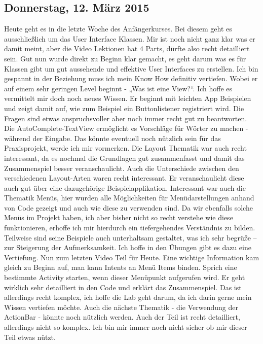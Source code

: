 \documentclass[12pt,a4paper,bibliography=totocnumbered,listof=totocnumbered]{scrartcl}
\begin{document}
\subsection{Donnerstag, 12. März 2015}
Heute geht es in die letzte Woche des Anfängerkurses. Bei diesem geht es ausschließlich um das User Interface Klassen. Mir ist noch nicht ganz klar was er damit meint, aber die Video Lektionen hat 4 Parts, dürfte also recht detailliert sein. 
Gut nun wurde direkt zu Beginn klar gemacht, es geht darum was es für Klassen gibt um gut aussehende und effektive User Interfaces zu erstellen. Ich bin gespannt in der Beziehung muss ich mein Know How definitiv vertiefen. Wobei er auf einem sehr geringen Level beginnt - „Was ist eine View?“. Ich hoffe es vermittelt mir doch noch neues Wissen. 
Er beginnt mit leichten App Beispielen und zeigt damit auf, wie zum Beispiel ein Buttonlistener registriert wird. Die Fragen sind etwas anspruchsvoller aber noch immer recht gut zu beantworten. Die AutoComplete-TextView ermöglicht es Vorschläge für Wörter zu machen - während der Eingabe. Das könnte eventuell noch nützlich sein für das Praxisprojekt, werde ich mir vormerken. Die Layout Thematik war auch recht interessant, da es nochmal die Grundlagen gut zusammenfasst und damit das Zusammenspiel besser veranschaulicht. Auch die Unterschiede zwischen den verschiedenen Layout-Arten waren recht interessant. Er veranschaulicht diese auch gut über eine dazugehörige Beispielapplikation. Interessant war auch die Thematik Menüs, hier wurden alle Möglichkeiten für Menüdarstellungen anhand von Code gezeigt und auch wie diese zu verwenden sind. Da wir ebenfalls solche Menüs im Projekt haben, ich aber bisher nicht so recht verstehe wie diese funktionieren, erhoffe ich mir hierdurch ein tiefergehendes Verständnis zu bilden. Teilweise sind seine Beispiele auch unterhaltsam gestaltet, was ich sehr begrüße – zur Steigerung der Aufmerksamkeit. Ich hoffe in den Übungen gibt es dazu eine Vertiefung. 
Nun zum letzten Video Teil für Heute. Eine wichtige Information kam gleich zu Beginn auf, man kann Intents an Menü Items binden. Sprich eine bestimmte Activity starten, wenn dieser Menüpunkt aufgerufen wird. Er geht wirklich sehr detailliert in den Code und erklärt das Zusammenspiel. Das ist allerdings recht komplex, ich hoffe die Lab geht darum, da ich darin gerne mein Wissen vertiefen möchte. Auch die nächste Thematik - die Verwendung der ActionBar - könnte noch nützlich werden. Auch der Teil ist recht detailliert, allerdings nicht so komplex. Ich bin mir immer noch nicht sicher ob mir dieser Teil etwas nützt. 
\end{document}
